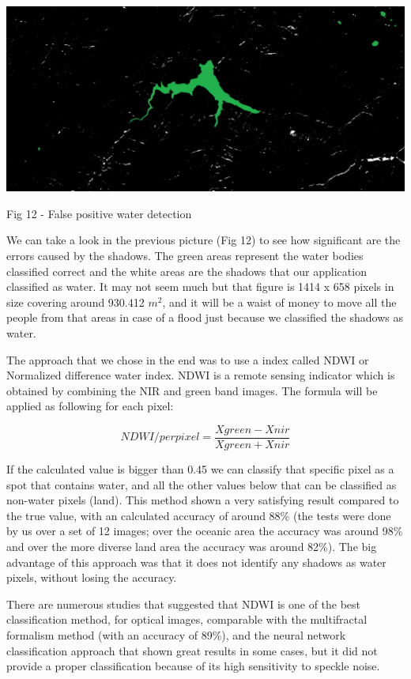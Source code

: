 \documentclass[12pt, a4paper]{report}
\begin{document}
\bigskip
\includegraphics[scale=0.4, left]{water-false-positive.png}
\begin{center}
Fig 12 - False positive water detection
\end{center}
\par 

We can take a look in the previous picture (Fig 12) to see how significant are the errors caused by the shadows. The green areas represent the water bodies classified correct and the white areas are the shadows that our application classified as water. It may not seem much but that figure is 1414 x 658 pixels in size covering around 930.412 $m^2$, and it will be a waist of money to move all the people from that areas in case of a flood just because we classified the shadows as water.
\par 

The approach that we chose in the end was to use a index called NDWI or Normalized difference water index. NDWI is a remote sensing indicator which is obtained by combining the NIR and green band images. The formula will be applied as following for each pixel:

$$ NDWI/perpixel = \frac{Xgreen - Xnir}{Xgreen + Xnir}$$

If the calculated value is bigger than 0.45 we can classify that specific pixel as a spot that contains water, and all the other values below that can be classified as non-water pixels (land). This method shown a very satisfying result compared to the true value, with an calculated accuracy of around 88\% (the tests were done by us over a set of 12 images; over the oceanic area the accuracy was around 98\% and over the more diverse land area the accuracy was around 82\%). The big advantage of this approach was that it does not identify any shadows as water pixels, without losing the accuracy. 
\par 
There are numerous studies \cite{NDWI, NDWI Comparison} that suggested that NDWI is one of the best classification method, for optical images, comparable with the multifractal formalism method (with an accuracy of 89\%), and the neural network classification approach that shown great results in some cases, but it did not provide a proper classification because of its high sensitivity to speckle noise.
\par 
\end{document}
